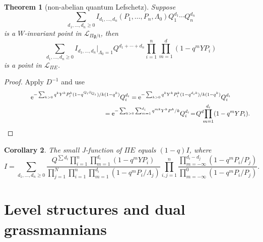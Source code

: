 \documentclass[pdftex]{sigma}
\numberwithin{equation}{section}
\newtheorem{Theorem}{Theorem}[section]
\newtheorem{Corollary}[Theorem]{Corollary}
\def\L{\mathcal L}
\def\p{\partial}
\begin{document}
\begin{Theorem}[{non-abelian quantum Lefschetz}]\label{thm5}
Suppose
\[
\sum_{d_1,\dots,d_n\geq 0} I_{d_1,\dots,d_n}(P_1,\dots,P_n,\Lambda_0) Q_1^{d_1}\cdots Q_n^{d_n}
\]
is a $W$-invariant point in $\L_{\Pi \mathfrak{g}/\mathfrak{t}}$, then
\[
\sum_{d_1,\dots,d_n\geq 0}I_{d_1,\dots,d_n}|_{\Lambda_0=1} Q^{d_1+\cdots+d_n}\prod_{i=1}^n\prod_{m=1}^d(1-q^mYP_i)
\]
is a point in $\L_{\Pi E}$.
\end{Theorem}
\begin{proof}Apply $D^{-1}$ and use
\begin{gather*}
{\rm e}^{-\sum_{k>0} q^kY^kP_i^k(1-q^{Q_i\p_{Q_i}})/k(1-q^k)} Q_i^{d_i} = {\rm e}^{-\sum_{k>0}q^kY^kP_i^k(1-q^{d_ik})/k(1-q^k)} Q_i^{d_i}
\\ \hphantom{{\rm e}^{-\sum_{k>0} q^kY^kP_i^k(1-q^{Q_i\p_{Q_i}})/k(1-q^k)} Q_i^{d_i}}
{}= {\rm e}^{ -\sum_{k>0} \sum_{m=1}^{d_i} q^{mk}Y^kP^k/k} Q_i^{d_i}\! = \! Q^d\!\!\prod_{m=1}^{d_i}(1-q^mYP_i). \!\!\! \!\!\tag*{\qed}
\end{gather*}
\renewcommand{\qed}{}
\end{proof}

\begin{Corollary}\label{cor4}
The small J-function of $\Pi E$ equals $(1-q)I$, where
\[
I=\sum_{d_1,\dots,d_n\geq 0}\frac{Q^{\sum d_i}\prod_{i=1}^n\prod_{m=1}^{d_i}(1-q^mYP_i)}{\prod_{j=1}^N\prod_{i=1}^n
\prod_{m=1}^{d_i}(1-q^mP_i/\Lambda_j)}\prod_{i,j=1}^n
\frac{\prod_{m=-\infty}^{d_i-d_j}(1-q^mP_i/P_j)}{\prod_{m=-\infty}^0(1-q^mP_i/P_j)}.
\]
\end{Corollary}

\section{Level structures and dual grassmannians}
\label{Sec7}
\end{document}
